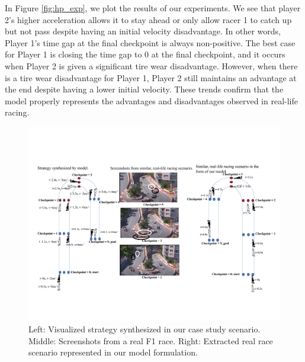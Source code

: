  In Figure \ref{fig:hp_exp}, we plot the results of our experiments. We see that player 2's higher acceleration allows it to stay ahead or only allow racer 1 to catch up but not pass despite having an initial velocity disadvantage. In other words, Player 1's time gap at the final checkpoint is always non-positive. The best case for Player 1 is closing the time gap to 0 at the final checkpoint, and it occurs when Player 2 is given a significant tire wear disadvantage. However, when there is a tire wear disadvantage for Player 1, Player 2 still maintains an advantage at the end despite having a lower initial velocity. These trends confirm that the model properly represents the advantages and disadvantages observed in real-life racing. 

\begin{figure}
\includegraphics[height=0.8\textwidth, width=\textheight]{Figures/HairpinViz.pdf}
    \caption[Synthesized strategy compared to real-life scenario on a hairpin turn.] {Left: Visualized strategy synthesized in our case study scenario. Middle: Screenshots from a real F1 race.  Right: Extracted real race scenario represented in our model formulation.}
    \label{fig:hp}
\end{figure}

